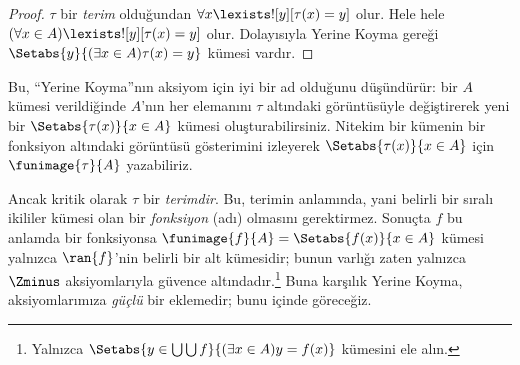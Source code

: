 \begin{proof}
$\tau$ bir \emph{terim} olduğundan
$\forall x\lexists![y][\tau(x)=y]$ olur. Hele hele
$(\forall x\in A)\lexists![y][\tau(x)=y]$ olur. Dolayısıyla Yerine Koyma
gereği $\Setabs{y}{(\exists x\in A)\tau(x)=y}$ kümesi vardır.
\end{proof}
\noindent
Bu, ``Yerine Koyma''nın aksiyom için iyi bir ad olduğunu düşündürür: bir
$A$ kümesi verildiğinde $A$'nın her elemanını $\tau$ altındaki görüntüsüyle
değiştirerek yeni bir $\Setabs{\tau(x)}{x\in A}$ kümesi oluşturabilirsiniz.
Nitekim bir kümenin bir fonksiyon altındaki görüntüsü gösterimini izleyerek
$\Setabs{\tau(x)}{x\in A}$ için $\funimage{\tau}{A}$ yazabiliriz.

Ancak kritik olarak $\tau$ bir \emph{terimdir}. Bu, terimin
 anlamında, yani belirli bir sıralı ikililer
kümesi olan bir \emph{fonksiyon} (adı) olmasını gerektirmez. Sonuçta $f$ bu
anlamda bir fonksiyonsa
$\funimage{f}{A}=\Setabs{f(x)}{x\in A}$ kümesi yalnızca $\ran{f}$'nin
belirli bir alt kümesidir; bunun varlığı zaten yalnızca $\Zminus$
aksiyomlarıyla güvence altındadır.\footnote{Yalnızca
$\Setabs{y \in \bigcup \bigcup f}{(\exists x \in A)y = f(x)}$ kümesini
ele alın.} Buna karşılık Yerine Koyma, aksiyomlarımıza \emph{güçlü} bir
eklemedir; bunu  içinde göreceğiz.

